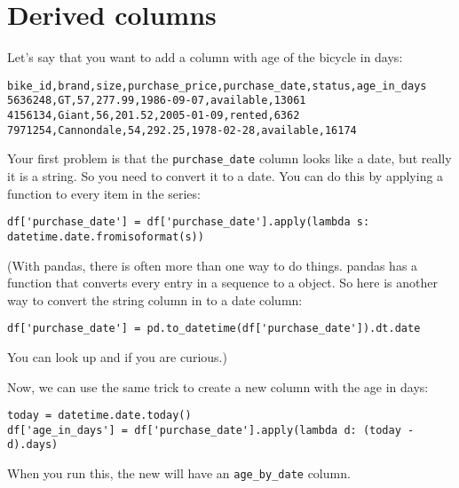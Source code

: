 \section{Derived columns}

Let's say that you want to add a column with age of the bicycle in days:
\begin{Verbatim}
bike_id,brand,size,purchase_price,purchase_date,status,age_in_days
5636248,GT,57,277.99,1986-09-07,available,13061
4156134,Giant,56,201.52,2005-01-09,rented,6362
7971254,Cannondale,54,292.25,1978-02-28,available,16174
\end{Verbatim}

Your first problem is that the \texttt{purchase\_date} column looks
like a date, but really it is a string. So you need to convert it to a
date.  You can do this by applying a function to every item in the series:
\begin{Verbatim}
df['purchase_date'] = df['purchase_date'].apply(lambda s: datetime.date.fromisoformat(s))
\end{Verbatim}

(With pandas, there is often more than one way to do things.  pandas
has a  function that converts every entry in
a sequence to a  object. So here is another way to
convert the string column in to a date column:
\begin{Verbatim}
df['purchase_date'] = pd.to_datetime(df['purchase_date']).dt.date
\end{Verbatim}
You can look up  and  if you are curious.)

Now, we can use the same trick to create a new column with the age in days:
\begin{Verbatim}
today = datetime.date.today()
df['age_in_days'] = df['purchase_date'].apply(lambda d: (today - d).days)
\end{Verbatim}

When you run this, the new  will have an \texttt{age\_by\_date} column.





